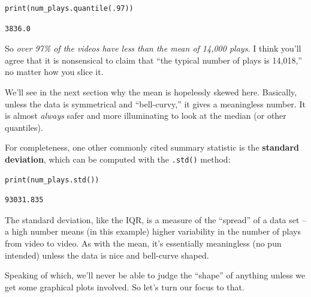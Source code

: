 \begin{Verbatim}[fontsize=\small,samepage=true,frame=single,framesep=3mm]
print(num_plays.quantile(.97))
\end{Verbatim}
\vspace{-.3in}

\begin{Verbatim}[fontsize=\small,samepage=true,frame=leftline,framesep=5mm,framerule=1mm]
3836.0
\end{Verbatim}

So \textit{over 97\% of the videos have less than the mean of 14,000 plays.} I
think you'll agree that it is nonsensical to claim that ``the typical number of
plays is 14,018,'' no matter how you slice it.


We'll see in the next section why the mean is hopelessly skewed here.
Basically, unless the data is symmetrical and ``bell-curvy,'' it gives a
meaningless number. It is almost \textit{always} safer and more illuminating to
look at the median (or other quantiles).

\label{standardDeviation}

For completeness, one other commonly cited summary statistic is the
\textbf{standard deviation}, which can be computed with the \texttt{.std()}
method:

\begin{Verbatim}[fontsize=\small,samepage=true,frame=single,framesep=3mm]
print(num_plays.std())
\end{Verbatim}
\vspace{-.3in}

\begin{Verbatim}[fontsize=\small,samepage=true,frame=leftline,framesep=5mm,framerule=1mm]
93031.835
\end{Verbatim}


The standard deviation, like the IQR, is a measure of the ``spread'' of a data
set -- a high number means (in this example) higher variability in the number
of plays from video to video. As with the mean, it's essentially meaningless
(no pun intended) unless the data is nice and bell-curve shaped.

Speaking of which, we'll never be able to judge the ``shape'' of anything
unless we get some graphical plots involved. So let's turn our focus to that.

